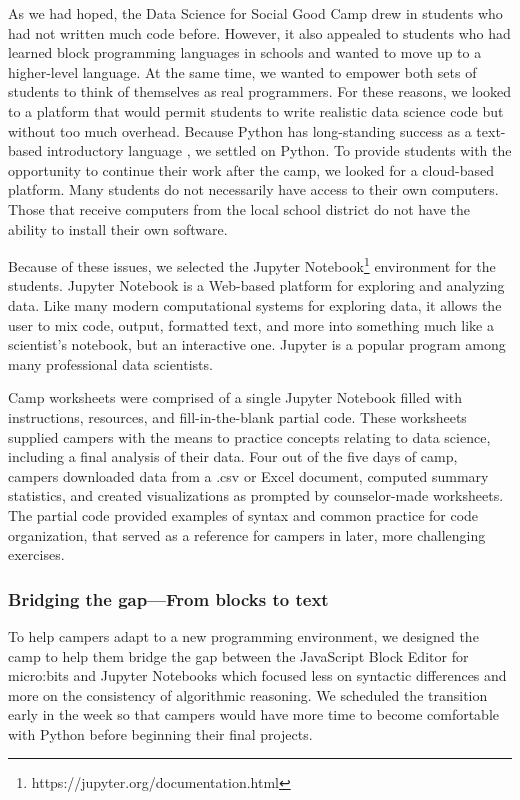 As we had hoped, the Data Science for Social Good Camp drew in
students who had not written much code before.  However, it also
appealed to students who had learned block programming languages
in schools and wanted to move up to a higher-level language.  At
the same time, we wanted to empower both sets of students to think
of themselves as real programmers.  For these reasons, we looked
to a platform that would permit students to write realistic data
science code but without too much overhead.  Because Python has
long-standing success as a text-based introductory language
\cite{Guo2014}, we settled on Python.  To provide students with the
opportunity to continue their work after the camp, we looked for a
cloud-based platform.  Many students do not necessarily have access
to their own computers.  Those that receive computers from the local
school district do not have the ability to install their own software.

Because of these issues, we selected the Jupyter
Notebook\footnote{https://jupyter.org/documentation.html} environment
for the students.
Jupyter Notebook is a Web-based platform for exploring and analyzing
data.  Like many modern computational systems for exploring data, it
allows the user to mix code, output, formatted text, and more into
something much like a scientist's notebook, but an interactive one.
Jupyter is a popular program among many professional data scientists.

Camp worksheets were comprised of a single Jupyter Notebook filled
with instructions, resources, and fill-in-the-blank partial code.
These worksheets supplied campers with the means to practice concepts
relating to data science, including a final analysis of their data.
Four out of the five days of camp, campers downloaded data from a
.csv or Excel document, computed summary statistics, and created
visualizations as prompted by counselor-made worksheets. The partial
code provided examples of syntax and common practice for code
organization, that served as a reference for campers in later, more
challenging exercises.

\subsubsection{Bridging the gap---From blocks to text}

To help campers adapt to a new programming environment, we designed
the camp to help them bridge the gap between the JavaScript Block
Editor for micro:bits and Jupyter Notebooks which focused less on
syntactic differences and more on the consistency of algorithmic
reasoning.  We scheduled the transition early in the week so that
campers would have more time to become comfortable with Python
before beginning their final projects.

